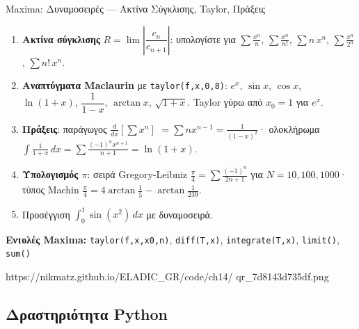 %

\casactivbox%
  {Maxima: Δυναμοσειρές — Ακτίνα Σύγκλισης, Taylor, Πράξεις}%
  {%
    \label{cas:ch14_power_series}
    \begin{enumerate}[label=(\alph*),itemsep=2pt]
      \item \textbf{Ακτίνα σύγκλισης} $R = \lim\left|\dfrac{c_n}{c_{n+1}}\right|$:
        υπολογίστε για $\sum\frac{x^n}{n}$, $\sum\frac{x^n}{n!}$,
        $\sum n\,x^n$, $\sum\frac{x^n}{2^n}$, $\sum n!\,x^n$.
      \item \textbf{Αναπτύγματα Maclaurin} με \texttt{taylor(f,x,0,8)}:
        $e^x$, $\sin x$, $\cos x$, $\ln(1+x)$, $\dfrac{1}{1-x}$,
        $\arctan x$, $\sqrt{1+x}$. Taylor γύρω από $x_0=1$ για $e^x$.
      \item \textbf{Πράξεις}: παράγωγος $\frac{d}{dx}\!\left[\sum x^n\right]$
        $=\sum nx^{n-1}=\frac{1}{(1-x)^2}$· ολοκλήρωμα
        $\int\!\frac{1}{1+x}\,dx = \sum\frac{(-1)^n x^{n+1}}{n+1}=\ln(1+x)$.
      \item \textbf{Υπολογισμός $\pi$}: σειρά Gregory-Leibniz
        $\frac{\pi}{4}=\sum\frac{(-1)^n}{2n+1}$ για $N=10,100,1000$·
        τύπος Machin $\frac{\pi}{4}=4\arctan\frac{1}{5}-\arctan\frac{1}{239}$.
      \item Προσέγγιση $\int_0^1\!\sin(x^2)\,dx$ με δυναμοσειρά.
    \end{enumerate}
    \smallskip
    \textbf{Εντολές Maxima:}
    \texttt{taylor(f,x,x0,n)}, \texttt{diff(T,x)},
    \texttt{integrate(T,x)}, \texttt{limit()}, \texttt{sum()}
  }%
  {https://nikmatz.github.io/ELADIC_GR/code/ch14/}%
  {qr_7d8143d735df.png}

\subsection*{Δραστηριότητα Python}


